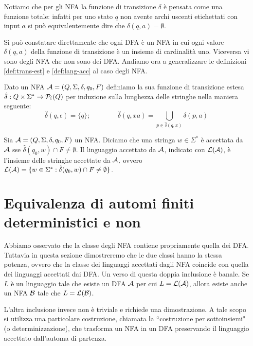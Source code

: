 \documentclass[runningheads,a4paper]{llncs}
\begin{document}
Notiamo che per gli NFA la funzione di transizione $\delta$ \`{e} pensata come una funzione totale: infatti per uno stato $q$ non avente archi uscenti etichettati con input $a$ si pu\`{o} equivalentemente dire che $\delta(q,a) = \emptyset$.

Si pu\`{o} constatare direttamente che ogni DFA \`{e} un NFA in cui ogni valore $\delta(q,a)$ della funzione di transizione \`{e} un insieme di cardinalit\`{a} uno. Viceversa vi sono degli NFA che non sono dei DFA. Andiamo ora a generalizzare le definizioni \ref{def:trans-est} e \ref{def:lang-acc} al caso degli NFA.

\begin{definition}\label{def:trans-est2}
Dato un NFA $\mathcal{A} = (Q,\Sigma,\delta,q_0,F)$ definiamo la sua funzione di transizione estesa $\hat{\delta}: Q \times \Sigma^* \to \mathcal{P}_\mathrm{f}(Q)$ per induzione sulla lunghezza delle stringhe nella maniera seguente:
$$ \hat{\delta}(q,\epsilon) = \{q\} ; \qquad \qquad \hat{\delta}(q,xa) = \bigcup_{p \in \hat{\delta}(q,x)} \delta(p,a) $$
\end{definition}

\begin{definition}\label{def:lang-acc2}
Sia $\mathcal{A} = (Q,\Sigma,\delta,q_0,F)$ un NFA. Diciamo che una stringa $w \in \Sigma^*$ \`{e} accettata da $\mathcal{A}$ sse $\hat{\delta}(q_0,w) \cap F \neq \emptyset$. Il linguaggio accettato da $\mathcal{A}$, indicato con $\mathcal{L}(\mathcal{A})$, \`{e} l'insieme delle stringhe accettate da $\mathcal{A}$, ovvero $\mathcal{L}(\mathcal{A}) = \{w \in \Sigma^* : \hat{\delta}(q_0,w) \cap F \neq \emptyset\}$.
\end{definition}

\section{Equivalenza di automi finiti deterministici e non}

Abbiamo osservato che la classe degli NFA contiene propriamente quella dei DFA. Tuttavia in questa sezione dimostreremo che le due classi hanno la stessa potenza, ovvero che la classe dei linguaggi accettati dagli NFA coincide con quella dei linguaggi accettati dai DFA. Un verso di questa doppia inclusione \`{e} banale. Se $L$ \`{e} un linguaggio tale che esiste un DFA $\mathcal{A}$ per cui $L = \mathcal{L}(\mathcal{A})$, allora esiste anche un NFA $\mathcal{B}$ tale che $L = \mathcal{L}(\mathcal{B})$.

L'altra inclusione invece non \`{e} triviale e richiede una dimostrazione. A tale scopo si utilizza una particolare costruzione, chiamata la ``costruzione per sottoinsiemi" (o determinizzazione), che trasforma un NFA in un DFA preservando il linguaggio accettato dall'automa di partenza.
\end{document}
